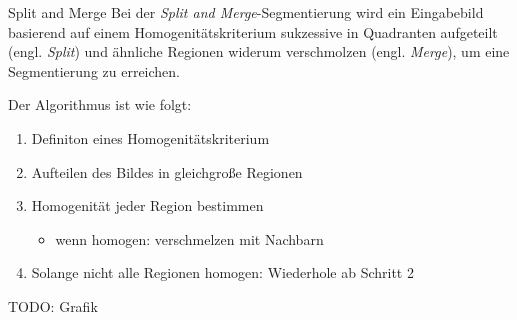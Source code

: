 \begin{defi}{Split and Merge}
    Bei der \emph{Split and Merge}-Segmentierung wird ein Eingabebild basierend auf einem Homogenitätskriterium sukzessive in Quadranten aufgeteilt (engl. \emph{Split}) und ähnliche Regionen widerum verschmolzen (engl. \emph{Merge}), um eine Segmentierung zu erreichen.

    Der Algorithmus ist wie folgt:
    \begin{enumerate}
        \item Definiton eines Homogenitätskriterium
        \item Aufteilen des Bildes in gleichgroße Regionen
        \item Homogenität jeder Region bestimmen
              \begin{itemize}
                  \item wenn homogen: verschmelzen mit Nachbarn
              \end{itemize}
        \item Solange nicht alle Regionen homogen: Wiederhole ab Schritt 2
    \end{enumerate}

    TODO: Grafik
\end{defi}


